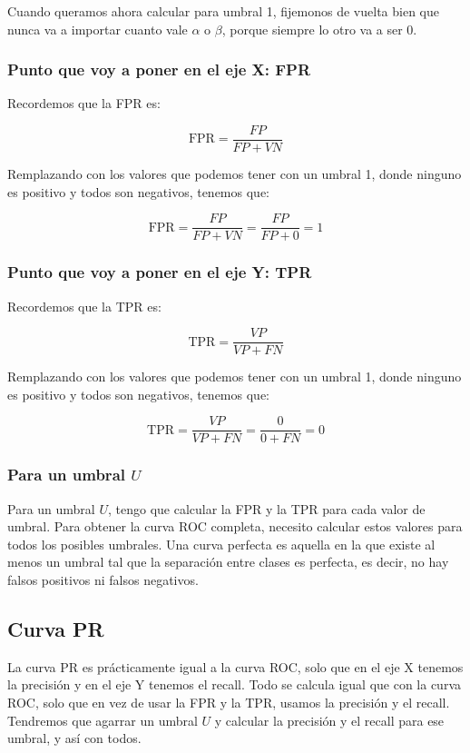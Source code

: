 \documentclass[12pt]{article}
\begin{document}
Cuando queramos ahora calcular para umbral 1, fijemonos de vuelta bien que nunca va a importar cuanto vale $\alpha$ o $\beta$, porque siempre lo otro va a ser 0.

\subsubsection{Punto que voy a poner en el eje X: FPR}

Recordemos que la FPR es:

\[
\text{FPR} = \frac{FP}{FP + VN}
\]

\vspace{0.3em}

Remplazando con los valores que podemos tener con un umbral 1, donde ninguno es positivo y todos son negativos, tenemos que:

\[
\text{FPR} = \frac{FP}{FP + VN} = \frac{FP}{FP + 0} = 1
\]

\subsubsection{Punto que voy a poner en el eje Y: TPR}


Recordemos que la TPR es:

\[
\text{TPR} = \frac{VP}{VP + FN}
\]

\vspace{0.3em}

Remplazando con los valores que podemos tener con un umbral 1, donde ninguno es positivo y todos son negativos, tenemos que:

\[
\text{TPR} = \frac{VP}{VP + FN} = \frac{0}{0 + FN} = 0
\]

\subsubsection{Para un umbral \( U \)}

Para un umbral \( U \), tengo que calcular la FPR y la TPR para cada valor de umbral. Para obtener la curva ROC completa, necesito calcular estos valores para todos los posibles umbrales. Una curva perfecta es aquella en la que existe al menos un umbral tal que la separación entre clases es perfecta, es decir, no hay falsos positivos ni falsos negativos.

\subsection{Curva PR}

La curva PR es prácticamente igual a la curva ROC, solo que en el eje X tenemos la precisión y en el eje Y tenemos el recall. Todo se calcula igual que con la curva ROC, solo que en vez de usar la FPR y la TPR, usamos la precisión y el recall. Tendremos que agarrar un umbral \( U \) y calcular la precisión y el recall para ese umbral, y así con todos.
\end{document}
